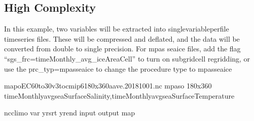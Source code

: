 \documentclass[letterpaper,10pt,english]{sphinxmanual}
\begin{document}
\subsection{High Complexity}
\label{\detokenize{mpas_regrid:high-complexity}}
In this example, two variables will be extracted into single\sphinxhyphen{}variable\sphinxhyphen{}per\sphinxhyphen{}file time\sphinxhyphen{}series files.
These will be compressed and deflated, and the data will be converted from double to single precision.
For mpas sea\sphinxhyphen{}ice files, add the flag “\textendash{}sgs\_frc=timeMonthly\_avg\_iceAreaCell” to turn on sub\sphinxhyphen{}grid\sphinxhyphen{}cell regridding,
or use the \textendash{}prc\_typ=mpasseaice to change the procedure type to mpas\sphinxhyphen{}sea\sphinxhyphen{}ice

\begin{sphinxVerbatim}[commandchars=\\\{\}]
map\PYGZus{}oEC60to30v3\PYGZus{}to\PYGZus{}cmip6\PYGZus{}180x360\PYGZus{}aave.20181001.nc                       
mpaso                                                                 
180x360                                                              
timeMonthly\PYGZus{}avg\PYGZus{}seaSurfaceSalinity,timeMonthly\PYGZus{}avg\PYGZus{}seaSurfaceTemperature   
                                                                      
                                                                        
                                            

ncclimo 
   
  \PYGZhy{}\PYGZhy{}var 
  \PYGZhy{}\PYGZhy{}yr\PYGZus{}srt 
  \PYGZhy{}\PYGZhy{}yr\PYGZus{}end 
  \PYGZhy{}\PYGZhy{}input 
  \PYGZhy{}\PYGZhy{}output 
  \PYGZhy{}\PYGZhy{}map
\end{sphinxVerbatim}



\renewcommand{\indexname}{Index}
\printindex
\end{document}
